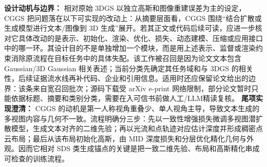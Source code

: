 \textbf{设计动机与边界：} 相对原始 3DGS 以独立高斯和图像重建误差为主的设定，CGGS 把问题落在以下可实现的改动上：从摘要层面看，CGGS 围绕“结合扩散或生成模型进行文本/图像到 3D 生成”展开。若其正文或代码后续可读，应进一步核对它具体改动的是表示、初始化、渲染、优化、损失、动态建模、压缩或应用接口中的哪一环。其设计目的不是单独增加一个模块，而是用上述表示、监督或渲染约束消除原流程在目标任务中的具体失配。该工作被召回是因为论文文本包含 Gaussian/3D Gaussian 相关表述；当前分类先确定其任务域和与 3DGS 的相关性，后续证据流水线再补代码、企业和引用信息。适用时还应保留论文给出的边界：该条来自宽召回批次；源码下载受 arXiv e-print 网络限制，部分论文暂时只能依据标题、摘要和类别分类，需要在入可信书前做人工/LLM精读复核。
\textbf{尾项实现澄清：} CGGS 的动机是第一人称视角重叠少、单人视角主导，导致文本生成的多视图内容与几何不一致。流程明确分三步：先以一致性增强损失微调多视图潜扩散模型，生成文本对齐的二维先验；再以光流和点轨迹对应估计深度并形成稠密点云布局；最后从该布局初始化高斯，由 MID 深度损失和分层优化精化几何与外观。因而它相对 SDS 类生成锚点的关键是把一致二维先验、布局和高斯精化串成可检查的训练流程。
